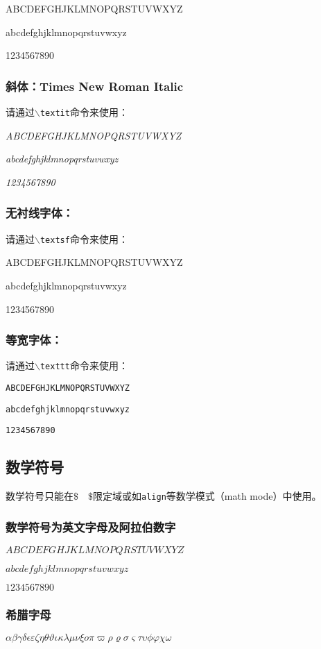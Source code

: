 ABCDEFGHJKLMNOPQRSTUVWXYZ 

abcdefghjklmnopqrstuvwxyz 

1234567890

\subsubsection{斜体：Times New Roman Italic}
请通过\texttt{$\backslash$textit}命令来使用：

\textit{ABCDEFGHJKLMNOPQRSTUVWXYZ}

\textit{abcdefghjklmnopqrstuvwxyz}

\textit{1234567890}

\subsubsection{无衬线字体：}
请通过\texttt{$\backslash$textsf}命令来使用：

\textsf{ABCDEFGHJKLMNOPQRSTUVWXYZ}

\textsf{abcdefghjklmnopqrstuvwxyz}

\textsf{1234567890}

\subsubsection{等宽字体：}
请通过\texttt{$\backslash$texttt}命令来使用：

\texttt{ABCDEFGHJKLMNOPQRSTUVWXYZ}

\texttt{abcdefghjklmnopqrstuvwxyz}

\texttt{1234567890}

\subsection{数学符号}
数学符号只能在$\$\quad\$$限定域或如\texttt{align}等数学模式（math mode）中使用。

\subsubsection{数学符号为英文字母及阿拉伯数字}
$ABCDEFGHJKLMNOPQRSTUVWXYZ$

$abcdefghjklmnopqrstuvwxyz$

$1234567890$

\subsubsection{希腊字母}
$\alpha\beta\gamma\delta\epsilon\varepsilon\zeta\eta\theta\vartheta\iota\kappa\lambda\mu\nu\xi o\pi\varpi\rho\varrho\sigma\varsigma\tau\upsilon\phi\varphi\chi\omega$

